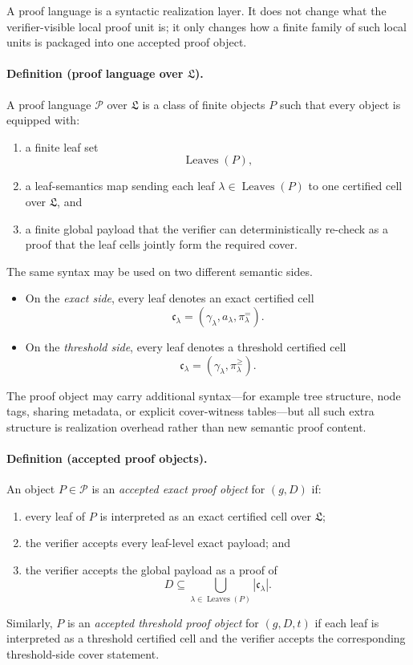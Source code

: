 A proof language is a syntactic realization layer. It does not change what the verifier-visible local proof unit is; it only changes how a finite family of such local units is packaged into one accepted proof object.

\paragraph{Definition (proof language over $\mathfrak L$).}
A proof language $\mathcal P$ over $\mathfrak L$ is a class of finite objects $P$ such that every object is equipped with:
\begin{enumerate}
    \item a finite leaf set
    \[
    \operatorname{Leaves}(P),
    \]
    \item a leaf-semantics map sending each leaf $\lambda\in\operatorname{Leaves}(P)$ to one certified cell over $\mathfrak L$, and
    \item a finite global payload that the verifier can deterministically re-check as a proof that the leaf cells jointly form the required cover.
\end{enumerate}

The same syntax may be used on two different semantic sides.
\begin{itemize}
    \item On the \emph{exact side}, every leaf denotes an exact certified cell
    \[
    \mathfrak c_\lambda=(\gamma_\lambda,a_\lambda,\pi_\lambda^{=}).
    \]
    \item On the \emph{threshold side}, every leaf denotes a threshold certified cell
    \[
    \mathfrak c_\lambda=(\gamma_\lambda,\pi_\lambda^{\ge}).
    \]
\end{itemize}
The proof object may carry additional syntax---for example tree structure, node tags, sharing metadata, or explicit cover-witness tables---but all such extra structure is realization overhead rather than new semantic proof content.

\paragraph{Definition (accepted proof objects).}
An object $P\in\mathcal P$ is an \emph{accepted exact proof object} for $(g,D)$ if:
\begin{enumerate}
    \item every leaf of $P$ is interpreted as an exact certified cell over $\mathfrak L$;
    \item the verifier accepts every leaf-level exact payload; and
    \item the verifier accepts the global payload as a proof of
    \[
    D\subseteq \bigcup_{\lambda\in\operatorname{Leaves}(P)} |\mathfrak c_\lambda|.
    \]
\end{enumerate}
Similarly, $P$ is an \emph{accepted threshold proof object} for $(g,D,t)$ if each leaf is interpreted as a threshold certified cell and the verifier accepts the corresponding threshold-side cover statement.

